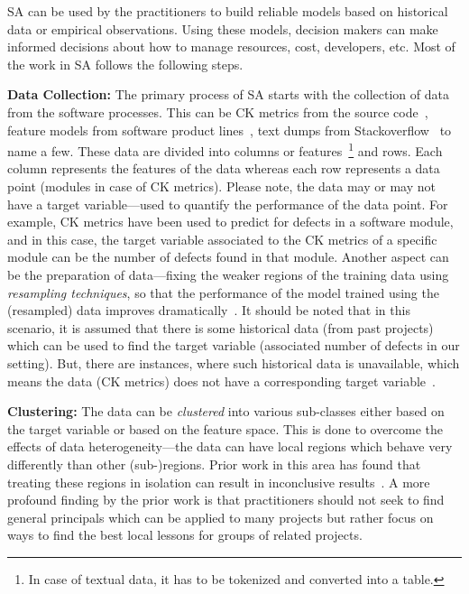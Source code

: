 \documentclass[table, xcdraw, sigconf,review, anonymous]{acmart}
\begin{document}
SA can be used by the practitioners to build reliable models based on historical data or empirical observations. Using these models, decision makers can make informed decisions about how to manage resources, cost, developers, etc. Most of the work in SA follows the following steps.

\noindent\textbf{Data Collection:} The primary process of SA starts with the collection of data from the software processes. This can be CK metrics from the source code~\cite{subramanyam2003empirical}, feature models from software product lines~\cite{sayyad2013value}, text dumps from Stackoverflow~\cite{agrawalwrong} to name a few. These data are divided into columns or features~\footnote{In case of textual data, it has to be tokenized and converted into a table.} and rows. Each column represents the features of the data whereas each row represents a data point (modules in case of CK metrics). Please note, the data may or may not have a target variable---used to quantify the performance of the data point. For example, CK metrics have been used to predict for defects in a software module, and in this case, the target variable associated to the CK metrics of a specific module can be the number of defects found in that module. Another aspect can be the preparation of data---fixing the weaker regions of the
training data using \textit{resampling techniques}, so that the performance of the model trained using the (resampled) data improves dramatically~\cite{agrawal2017better, bennin2017mahakil}. It should be noted that in this scenario, it is assumed that there is some historical data (from past projects) which can be used to find the target variable (associated number of defects in our setting). But, there are instances, where such historical data is unavailable, which means the data (CK metrics) does not have a corresponding target variable~\cite{yang2016effort}. 

\noindent\textbf{Clustering:} The data can be \textit{clustered} into various sub-classes either based on the target variable or based on the feature space. This is done to overcome the effects of data heterogeneity---the data can have local regions which behave very differently than other (sub-)regions. Prior work in this area has found that treating these regions in isolation can result in inconclusive results~\cite{menzies2011local, menzies2013local, bettenburg2012think}. A more profound finding by the prior work is that practitioners should not seek to find general principals which can be applied to many projects but rather focus on ways to find the best local lessons for groups of related projects. 
\end{document}
